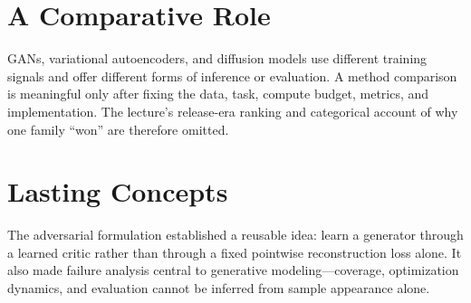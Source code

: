 \documentclass{article}
\begin{document}
\section{A Comparative Role}

GANs, variational autoencoders, and diffusion models use different training signals and
offer different forms of inference or evaluation. A method comparison is meaningful
only after fixing the data, task, compute budget, metrics, and implementation. The
lecture's release-era ranking and categorical account of why one family ``won'' are
therefore omitted.


\section{Lasting Concepts}

The adversarial formulation established a reusable idea: learn a generator through a
learned critic rather than through a fixed pointwise reconstruction loss alone. It also
made failure analysis central to generative modeling---coverage, optimization dynamics,
and evaluation cannot be inferred from sample appearance alone.
\end{document}
